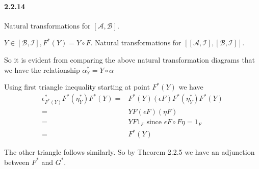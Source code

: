 \documentclass{article}
\begin{document}
\paragraph {2.2.14 }

Natural transformations for $[\mathcal{A}, \mathcal{B}]$.

\begin{center}
\end{center}

$Y \in [\mathcal{B},\mathcal{I}], F^*(Y) = Y \circ F$. Natural transformations for $[[\mathcal{A},\mathcal{I}], [\mathcal{B},\mathcal{I}]]$.

\begin{center}
\end{center}

So it is evident from comparing the above natural transformation diagrams that we have the relationship $\alpha^*_Y = Y \circ \alpha$

Using first triangle inequality starting at point $F^*(Y)$ we have
\begin{align*}
  \epsilon^*_{F^*(Y)}F^*(\eta_Y^*)F^*(Y) = & F^*(Y) (\epsilon F) F^*(\eta_Y^*)F^*(Y) \\
  = & Y F(\epsilon F)(\eta F) \\
  = & YF1_F \text{ since } \epsilon F \circ F \eta = 1_F\\
  = & F^*(Y)
\end{align*}

The other triangle follows similarly. So by Theorem 2.2.5 we have an adjunction between $F^*$ and $G^*$.
\end{document}
